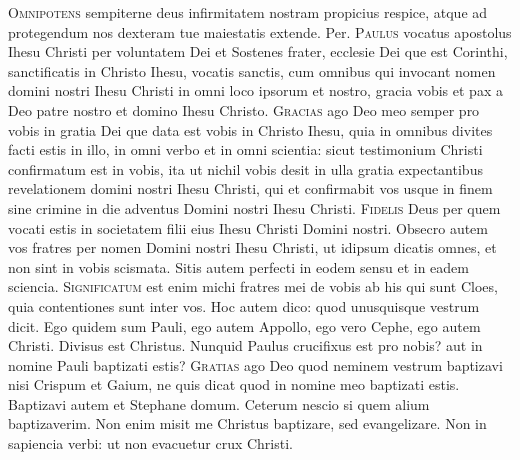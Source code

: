 \begin{multicols*}{2}
{\color{Red} }
\par {}
\lettrine[lines=2]{\zallmancaps \color{Red} O}{mnipotens} sempiterne deus infirmitatem nostram propicius respice, atque ad protegendum nos dexteram tue maiestatis extende. Per.
\lettrine[lines=2]{\zallmancaps \color{Blue} P}{aulus} vocatus apostolus Ihesu Christi per voluntatem Dei et Sostenes frater, ecclesie Dei que est Corinthi, sanctificatis in Christo Ihesu, vocatis sanctis, cum omnibus qui invocant nomen domini nostri Ihesu Christi in omni loco ipsorum et nostro, gracia vobis et pax a Deo patre nostro et domino Ihesu Christo.
\lettrine[lines=2]{\zallmancaps \color{Red} G}{racias} ago Deo meo semper pro vobis in gratia Dei que data est vobis in Christo Ihesu, quia in omnibus divites facti estis in illo, in omni verbo et in omni scientia: sicut testimonium Christi confirmatum est in vobis, ita ut nichil vobis desit in ulla gratia expectantibus revelationem domini nostri Ihesu Christi, qui et confirmabit vos usque in finem sine crimine in die adventus Domini nostri Ihesu Christi.
\lettrine[lines=2]{\zallmancaps \color{Blue} F}{idelis} Deus per quem vocati estis in societatem filii eius Ihesu Christi Domini nostri. Obsecro autem vos fratres per nomen Domini nostri Ihesu Christi, ut idipsum dicatis omnes, et non sint in vobis scismata. Sitis autem perfecti in eodem sensu et in eadem sciencia.
\lettrine[lines=2]{\zallmancaps \color{Red} S}{ignificatum} est enim michi fratres mei de vobis ab his qui sunt Cloes, quia contentiones sunt inter vos. Hoc autem dico: quod unusquisque vestrum dicit. Ego quidem sum Pauli, ego autem Appollo, ego vero Cephe, ego autem Christi. Divisus est Christus. Nunquid Paulus crucifixus est pro nobis? aut in nomine Pauli baptizati estis?
\lettrine[lines=2]{\zallmancaps \color{Blue} G}{ratias} ago Deo quod neminem vestrum baptizavi nisi Crispum et Gaium, ne quis dicat quod in nomine meo baptizati estis. Baptizavi autem et Stephane domum. Ceterum nescio si quem alium baptizaverim. Non enim misit me Christus baptizare, sed evangelizare. Non in sapiencia verbi: ut non evacuetur crux Christi.

\end{multicols*}
